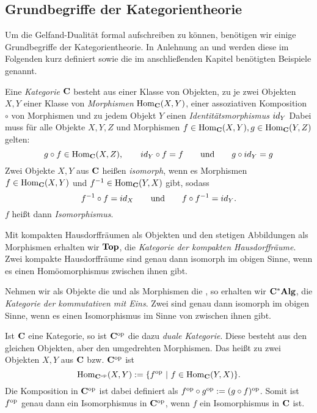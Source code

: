 \subsection{Grundbegriffe der Kategorientheorie}\label{sec:Kategorientheorie}

Um die Gelfand-Dualität formal aufschreiben zu können, benötigen wir einige Grundbegriffe der Kategorientheorie. In Anlehnung an \cite[S. 2-23]{Pizza2013} und \cite[S. 1-6]{Ambrogio2009} werden diese im Folgenden kurz definiert sowie die im anschließenden Kapitel benötigten Beispiele genannt.

\begin{defn}[Kategorie]
Eine \emph{Kategorie} $\mathbf{C}$ besteht aus einer Klasse von Objekten, zu je zwei Objekten $X, Y$ einer Klasse von \emph{Morphismen} $\mathrm{Hom}_{\mathbf{C}}(X,Y)$, einer assoziativen Komposition $\circ$ von Morphismen und zu jedem Objekt $Y$ einen \emph{Identitätsmorphismus} $id_Y$ Dabei muss für alle Objekte $X, Y, Z$ und Morphismen $f \in \mathrm{Hom}_{\mathbf{C}}(X,Y), g \in \mathrm{Hom}_{\mathbf{C}}(Y,Z)$ gelten:
	\[g \circ f \in \mathrm{Hom}_{\mathbf{C}}(X,Z),\qquad id_Y \circ f = f \qquad\text{und}\qquad g \circ id_Y = g\]
Zwei Objekte $X, Y$ aus $\mathbf{C}$ heißen \emph{isomorph}, wenn es Morphismen $f \in \mathrm{Hom}_{\mathbf{C}}(X,Y)$ und $f^{-1} \in\mathrm{Hom}_{\mathbf{C}}(Y,X)$ gibt, sodass
	\[f^{-1} \circ f = id_X \qquad\text{und}\qquad f \circ f^{-1} = id_Y.\]
	$f$ heißt dann \emph{Isomorphismus}.
\end{defn}

\begin{bsp}
Mit kompakten Hausdorffräumen als Objekten und den stetigen Abbildungen als Morphismen erhalten wir $\mathbf{Top}$, die \emph{Kategorie der kompakten Hausdorffräume}. Zwei kompakte Hausdorffräume sind genau dann isomorph im obigen Sinne, wenn es einen Homöomorphismus zwischen ihnen gibt.
\end{bsp}

\begin{bsp}
Nehmen wir als Objekte die \CAlgn{} und als Morphismen die \CAlgHomn{}, so erhalten wir $\mathbf{C^*Alg}$, die \emph{Kategorie der kommutativen \CAlgn{} mit Eins}. Zwei \CAlgn{} sind genau dann isomorph im obigen Sinne, wenn es einen Isomorphismus im Sinne von  zwischen ihnen gibt.
\end{bsp}

\begin{bsp}
Ist $\mathbf{C}$ eine Kategorie, so ist $\mathbf{C}^{\mathrm{op}}$ die dazu \emph{duale Kategorie}. Diese besteht aus den gleichen Objekten, aber den \glqq umgedrehten\grqq{} Morphismen. Das heißt zu zwei Objekten $X, Y$ aus $\mathbf{C}$ bzw. $\mathbf{C}^{\mathrm{op}}$ ist 
	\[\mathrm{Hom}_{\mathbf{C}^{\mathrm{op}}}(X,Y) := \{f^{\mathrm{op}} ~|~ f \in \mathrm{Hom}_{\mathbf{C}}(Y,X)\}.\]
Die Komposition in $\mathbf{C}^{\mathrm{op}}$ ist dabei definiert als $f^{\mathrm{op}} \circ g^{\mathrm{op}} := (g \circ f)^{\mathrm{op}}$. Somit ist $f^{\mathrm{op}}$ genau dann ein Isomorphismus in $\mathbf{C}^{\mathrm{op}}$, wenn $f$ ein Isomorphismus in $\mathbf{C}$ ist.
\end{bsp}



